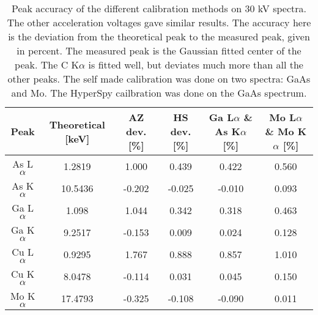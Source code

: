 
\begin{table}[p]
    \centering
    \caption{
        Peak accuracy of the different calibration methods on 30 kV spectra.
        The other acceleration voltages gave similar results.
        The accuracy here is the deviation from the theoretical peak to the measured peak, given in percent.
        The measured peak is the Gaussian fitted center of the peak.
        The C K$\alpha$ is fitted well, but deviates much more than all the other peaks.
        The self made calibration was done on two spectra: GaAs and Mo. %
        The HyperSpy cailbration was done on the GaAs spectrum.
    }
    \label{tab:results:calibration-peak-accuracy}
    \begin{tabular}{cccccc}
        Peak         & Theoretical [keV] & AZ dev. [\%] & HS dev. [\%] & Ga L{$\alpha$} \& As K{$\alpha$} [\%] & Mo L{$\alpha$} \& Mo K{$\alpha$} [\%] \\
        \hline
        As L$\alpha$ & 1.2819            & 1.000        & 0.439        & 0.422                                 & 0.560                                 \\
        As K$\alpha$ & 10.5436           & -0.202       & -0.025       & -0.010                                & 0.093                                 \\
        Ga L$\alpha$ & 1.098             & 1.044        & 0.342        & 0.318                                 & 0.463                                 \\
        Ga K$\alpha$ & 9.2517            & -0.153       & 0.009        & 0.024                                 & 0.128                                 \\
        Cu L$\alpha$ & 0.9295            & 1.767        & 0.888        & 0.857                                 & 1.010                                 \\
        Cu K$\alpha$ & 8.0478            & -0.114       & 0.031        & 0.045                                 & 0.150                                 \\
        Mo K$\alpha$ & 17.4793           & -0.325       & -0.108       & -0.090                                & 0.011                                 \\

\end{tabular}
\end{table}
